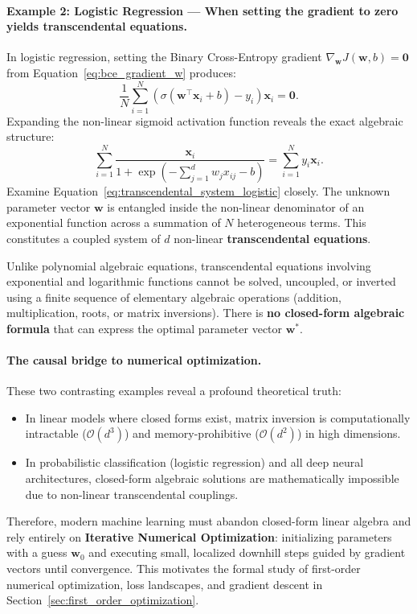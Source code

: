 \paragraph{Example 2: Logistic Regression --- When setting the gradient to zero yields transcendental equations.}
In logistic regression, setting the Binary Cross-Entropy gradient $\nabla_\mathbf{w} J(\mathbf{w}, b) = \mathbf{0}$ from Equation~\eqref{eq:bce_gradient_w} produces:
\begin{equation}
\frac{1}{N} \sum_{i=1}^N \left( \sigma(\mathbf{w}^\top \mathbf{x}_i + b) - y_i \right) \mathbf{x}_i = \mathbf{0}.
\label{eq:bce_stationary_first_order}
\end{equation}
Expanding the non-linear sigmoid activation function reveals the exact algebraic structure:
\begin{equation}
\sum_{i=1}^N \frac{\mathbf{x}_i}{1 + \exp\left(-\sum_{j=1}^d w_j x_{ij} - b\right)} = \sum_{i=1}^N y_i \mathbf{x}_i.
\label{eq:transcendental_system_logistic}
\end{equation}
Examine Equation~\eqref{eq:transcendental_system_logistic} closely. The unknown parameter vector $\mathbf{w}$ is entangled inside the non-linear denominator of an exponential function across a summation of $N$ heterogeneous terms. This constitutes a coupled system of $d$ non-linear \textbf{transcendental equations}.

Unlike polynomial algebraic equations, transcendental equations involving exponential and logarithmic functions cannot be solved, uncoupled, or inverted using a finite sequence of elementary algebraic operations (addition, multiplication, roots, or matrix inversions). There is \textbf{no closed-form algebraic formula} that can express the optimal parameter vector $\mathbf{w}^*$.

\paragraph{The causal bridge to numerical optimization.}
These two contrasting examples reveal a profound theoretical truth:
\begin{itemize}[noitemsep,topsep=2pt,parsep=0pt,partopsep=0pt]
  \item In linear models where closed forms exist, matrix inversion is computationally intractable ($\mathcal{O}(d^3)$) and memory-prohibitive ($\mathcal{O}(d^2)$) in high dimensions.
  \item In probabilistic classification (logistic regression) and all deep neural architectures, closed-form algebraic solutions are mathematically impossible due to non-linear transcendental couplings.
\end{itemize}
Therefore, modern machine learning must abandon closed-form linear algebra and rely entirely on \textbf{Iterative Numerical Optimization}: initializing parameters with a guess $\mathbf{w}_0$ and executing small, localized downhill steps guided by gradient vectors until convergence. This motivates the formal study of first-order numerical optimization, loss landscapes, and gradient descent in Section~\ref{sec:first_order_optimization}.

